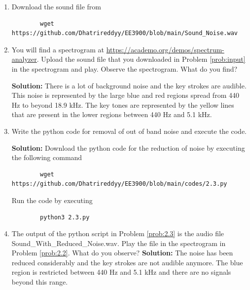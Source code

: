 \documentclass[journal,12pt,twocolumn]{IEEEtran}
\newcommand{\solution}{\noindent \textbf{Solution: }}
\numberwithin{equation}{section}
\renewcommand\thesection{\arabic{section}}
\begin{document}
	\begin{enumerate}[label=\thesection.\arabic*,ref=\thesection.\theenumi]
	\item \label{prob:2.1} Download the sound file from  
	\begin{lstlisting}
		wget https://github.com/Dhatrireddyy/EE3900/blob/main/Sound_Noise.wav
	\end{lstlisting}
	
	\item \label{prob:2.2} You will find a spectrogram at \href{https://academo.org/demos/spectrum-analyzer}{\url{https://academo.org/demos/spectrum-analyzer}}. Upload the sound file that you downloaded in Problem \ref{prob:input} in the spectrogram  and play.  Observe the spectrogram. What do you find?
	
	\solution There is a lot of background noise and the key strokes are audible. This noise is represented by the large blue and red regions spread from 440 Hz to beyond 18.9 kHz. The key tones are represented by the yellow lines that are present in the lower regions between 440 Hz and 5.1 kHz.
	
	\item \label{prob:2.3} Write the python code for removal of out of band noise and execute the code. 
	
	\solution Download the python code for the reduction of noise by executing the following command
	\begin{lstlisting}
		wget https://github.com/Dhatrireddyy/EE3900/blob/main/codes/2.3.py
	\end{lstlisting}
	
	Run the code by executing
	\begin{lstlisting}
		python3 2.3.py
	\end{lstlisting}
	
	\item The output of the python script in Problem \ref{prob:2.3} is the audio file Sound\_With\_Reduced\_Noise.wav. Play the file in the spectrogram in Problem \ref{prob:2.2}. What do you observe?
	\solution The noise has been reduced considerably and the key strokes are not audible anymore. The blue region is restricted between 440 Hz and 5.1 kHz and there are no signals beyond this range.
	
	\end{enumerate}
	
\end{document}
